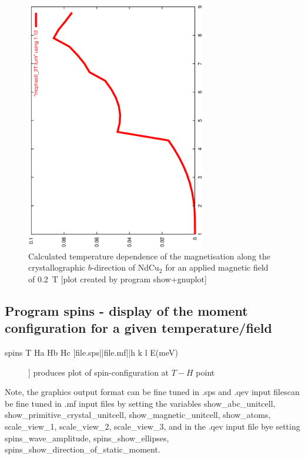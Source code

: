 \begin{figure}[hb]%
\begin{center}\leavevmode
\includegraphics[angle=-90, width=0.7\textwidth]{figsrc/ndcu2b/resultss/mag0_2T.ps}
\end{center}
\caption{Calculated temperature dependence of the magnetisation  along the crystallographic
$b$-direction  of NdCu$_2$ for an applied magnetic field of 0.2~T 
[plot created by program {\prg show+gnuplot}]}
\label{magnetizationgraphic}
\end{figure}


\subsection{Program {\prg spins} - display of the moment configuration for a given %
temperature/field}
\label{spins}

\begin{description} 
\item [spins T Ha Hb Hc [file.sps||file.mf||h k l E(meV)]]       produces plot of spin-configuration at $T-H$ %
point
\end{description} 

Note, the graphics output format can be fine tuned in .sps and .qev input filescan be fine tuned in .mf input %
files by setting the variables
{\prg show\_abc\_unitcell, show\_primitive\_crystal\_unitcell, show\_magnetic\_unitcell, show\_atoms, %
scale\_view\_1,
scale\_view\_2, scale\_view\_3}, and in
the  .qev input file bye setting 
{\prg spins\_wave\_amplitude, spins\_show\_ellipses, spins\_show\_direction\_of\_static\_moment}.

